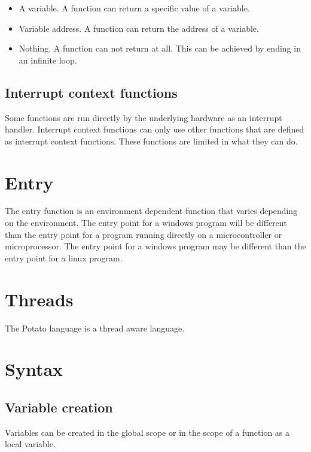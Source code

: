 \documentclass[12pt]{article}
\begin{document}
\begin{itemize}
\item A variable. A function can return a specific value of a variable.
\item Variable address. A function can return the address of a variable.
\item Nothing. A function can not return at all. This can be achieved by ending in an infinite loop.
\end{itemize}

\subsection {Interrupt context functions}

Some functions are run directly by the underlying hardware as an interrupt handler. Interrupt context functions can only use other functions that are defined as interrupt context functions. These functions are limited in what they can do.


\section {Entry}
The entry function is an environment dependent function that varies depending on the environment. The entry point for a windows program will be different than the entry point for a program running directly on a microcontroller or microprocessor. The entry point for a windows program may be different than the entry point for a linux program.

\section {Threads}
The Potato language is a thread aware language.

\section {Syntax}

\subsection {Variable creation}

Variables can be created in the global scope or in the scope of a function as a local variable.
\end{document}
